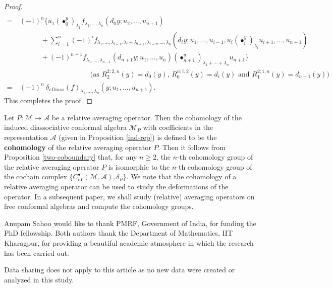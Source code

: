 \documentclass[a4paper,reqno,10pt]{amsart}
\theoremstyle{plain}
\theoremstyle{definition}
\theoremstyle{remark}
\newcommand{\M}{\mathcal{M}}
\newcommand{\la}{\lambda}
\begin{document}
\begin{proof}
\begin{align*}
\end{align*}
\begin{align*}
=~&(-1)^n \bigg\{
u_1(\bullet_0^y)_{\la_1} f_{\la_2, \ldots , \la_n}(d_{0}y;u_2,\ldots,u_{n+1})\\
& \qquad \quad +\sum_{i=1}^{n}(-1)^i
f_{ \la_{1}, \ldots , \la_{i-1}, \la_{i}+ \la_{i+1}, \la_{i+2}, \ldots , \la_{n}}\left(d_{i}y;u_1,\ldots,u_{i-1},
u_i(\bullet_i^y)_{\la_i} u_{i+1},\ldots,u_{n+1}\right)\\
&  \qquad \quad +(-1)^{n+1}f_{\la_1, \ldots, \la_{n-1}}(d_{n+1}y;u_1,\ldots,u_n)
(\bullet_{n+1}^y)_{\la_1 + \cdots + \la_n} u_{n+1}
\bigg\} \\
& \quad \qquad \quad \qquad \quad \qquad \quad  \text{(as $R_2^{2;2,n}(y)=d_0(y)$,~$R_0^{n;i,2}(y)=d_i(y)$ and $R_1^{2;1,n}(y)=d_{n+1}(y)$)}\\
=~&(-1)^n ~ \! \delta_{cDiass}(f)_{\la_1, \ldots, \la_n}(y; u_1,\ldots,u_{n+1}).
\end{align*}
This completes the proof.
\end{proof}

Let $P: \M \rightarrow \mathcal{A}$ be a relative averaging operator. Then the cohomology of the induced diassociative conformal algebra $\M_P$ with coefficients in the representation $\mathcal{A}$ (given in Proposition \ref{ind-rep}) is defined to be the {\bf cohomology} of the relative averaging operator $P$. Then it follows from Proposition \ref{two-coboundary} that, for any $n \geq 2$, the $n$-th cohomology group of the relative averaging operator $P$ is isomorphic to the $n$-th cohomology group of the cochain complex $\{ C^\bullet_{cY} (\M, \mathcal{A}), \delta_P \}$. We note that the cohomology of a relative averaging operator can be used to study the deformations of the operator. In a subsequent paper, we shall study (relative) averaging operators on free conformal algebras \cite{roitman-1,free-roit} and compute the cohomology groups.

\medskip

Anupam Sahoo would like to thank PMRF, Government of India, for funding the PhD fellowship. Both authors thank the Department of Mathematics, IIT Kharagpur, for providing a beautiful academic atmosphere in which the research has been carried out.

\medskip

 Data sharing does not apply to this article as no new data were created or analyzed in this study.
\end{document}
